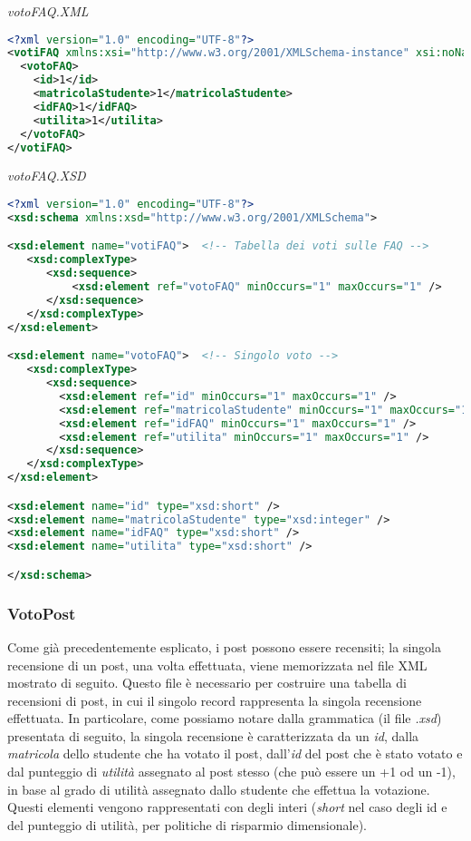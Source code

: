 \documentclass [a4paper,11pt]{book}
\begin{document}
\medskip

\emph{votoFAQ.XML}

\label{sec:votoFAQ}

\begin{lstlisting}[language=XML]
<?xml version="1.0" encoding="UTF-8"?>
<votiFAQ xmlns:xsi="http://www.w3.org/2001/XMLSchema-instance" xsi:noNamespaceSchemaLocation="votoFAQ.xsd">
  <votoFAQ>
    <id>1</id>
    <matricolaStudente>1</matricolaStudente>
    <idFAQ>1</idFAQ>
    <utilita>1</utilita>
  </votoFAQ>
</votiFAQ>
\end{lstlisting}

\emph{votoFAQ.XSD}

\begin{lstlisting}[language=XML]
<?xml version="1.0" encoding="UTF-8"?>
<xsd:schema xmlns:xsd="http://www.w3.org/2001/XMLSchema">

<xsd:element name="votiFAQ">  <!-- Tabella dei voti sulle FAQ -->
   <xsd:complexType> 
      <xsd:sequence>
	      <xsd:element ref="votoFAQ" minOccurs="1" maxOccurs="1" />
      </xsd:sequence>
   </xsd:complexType>
</xsd:element>

<xsd:element name="votoFAQ">  <!-- Singolo voto -->
   <xsd:complexType> 
      <xsd:sequence>
        <xsd:element ref="id" minOccurs="1" maxOccurs="1" /> 
        <xsd:element ref="matricolaStudente" minOccurs="1" maxOccurs="1" />
        <xsd:element ref="idFAQ" minOccurs="1" maxOccurs="1" /> 
        <xsd:element ref="utilita" minOccurs="1" maxOccurs="1" /> 
      </xsd:sequence>
   </xsd:complexType>
</xsd:element>

<xsd:element name="id" type="xsd:short" />
<xsd:element name="matricolaStudente" type="xsd:integer" />
<xsd:element name="idFAQ" type="xsd:short" />
<xsd:element name="utilita" type="xsd:short" />

</xsd:schema>
\end{lstlisting}

\medskip

\subsubsection{VotoPost}

Come già precedentemente esplicato, i post possono essere recensiti; la singola recensione di un post, una volta effettuata, viene memorizzata nel file XML mostrato di seguito. Questo file è necessario per costruire una tabella di recensioni di post, in cui il singolo record rappresenta la singola recensione effettuata. In particolare, come possiamo notare dalla grammatica (il file \emph{.xsd}) presentata di seguito, la singola recensione è caratterizzata da un \emph{id}, dalla \emph{matricola} dello studente che ha votato il post, dall'\emph{id} del post che è stato votato e dal punteggio di \emph{utilità} assegnato al post stesso (che può essere un +1 od un -1), in base al grado di utilità assegnato dallo studente che effettua la votazione. Questi elementi vengono rappresentati con degli interi (\emph{short} nel caso degli id e del punteggio di utilità, per politiche di risparmio dimensionale).
\end{document}

